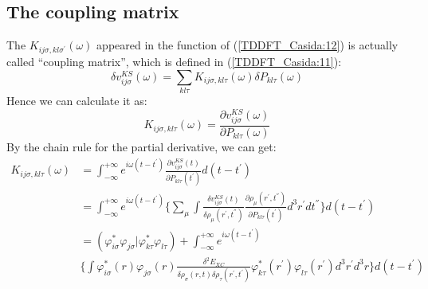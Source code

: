 \subsection{The coupling matrix}
\label{sec:coupling_matrix_in_TDDFT}
%
%
%
%
%
The $K_{ij\sigma, kl\sigma^{'}}(\omega)$ appeared in the function of
(\ref{TDDFT_Casida:12}) is actually called ``coupling matrix'', which
is defined in (\ref{TDDFT_Casida:11}):
\begin{equation}
\delta v^{KS}_{ij\sigma} (\omega) = \sum_{kl\tau}K_{ij\sigma,
kl\tau}(\omega) \delta P_{kl\tau} (\omega) 
\end{equation}
Hence we can calculate it as:
\begin{equation}
 K_{ij\sigma, kl\tau}(\omega) = \frac{\partial v^{KS}_{ij\sigma}
(\omega)}{\partial P_{kl\tau} (\omega)}
\end{equation} 
By the chain rule for the partial derivative, we can get:
\begin{align}
\label{TDDFT_Casida:13}
  K_{ij\sigma, kl\tau}(\omega) &=\int^{+\infty}_{-\infty}
e^{i\omega(t-t^{'})} \frac{\partial v^{KS}_{ij\sigma}
(t)}{\partial P_{kl\tau} (t^{'})} d(t-t^{'}) \nonumber \\
&= \int^{+\infty}_{-\infty}
e^{i\omega(t-t^{'})} \Bigg\{ 
\sum_{\mu}\int 
\frac{\delta v^{KS}_{ij\sigma}(t)}
{\delta \rho_{\mu} (r^{'}, t^{''})}
\frac{\partial\rho_{\mu} (r^{'},t^{''})}{\partial P_{kl\tau} (t^{'})}
d^{3}r^{'}dt^{''}
 \Bigg\} d(t-t^{'}) \nonumber \\
&=
(\varphi^{*}_{i\sigma}\varphi_{j\sigma}|\varphi^{*}_{k\tau}\varphi_{
l\tau}) + \int^{+\infty}_{-\infty}
e^{i\omega(t-t^{'})} \nonumber \\
&\Bigg\{
\int
\varphi^{*}_{i\sigma}(r)\varphi_{j\sigma}(r)  
\frac{\delta^{2} E_{XC}}
{\delta \rho_{\sigma} (r, t)\delta \rho_{\tau} (r^{'}, t^{'})}
\varphi^{*}_{k\tau}(r^{'})\varphi_{l\tau}(r^{'})
d^{3}r^{'}d^{3}r
\Bigg\} d(t-t^{'})
\end{align}

